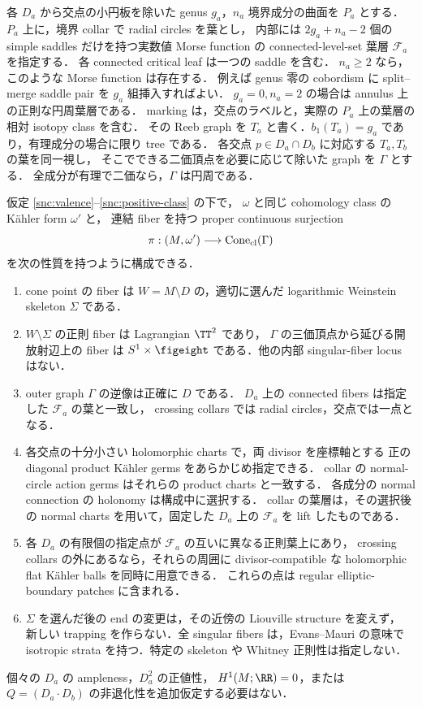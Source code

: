 各 $D_a$ から交点の小円板を除いた genus $g_a$，$n_a$ 境界成分の曲面を $P_a$ とする．
$P_a$ 上に，境界 collar で radial circles を葉とし，
内部には $2g_a+n_a-2$ 個の simple saddles だけを持つ実数値 Morse function の
connected-level-set 葉層 $\mathcal F_a$ を指定する．
各 connected critical leaf は一つの saddle を含む．
$n_a\geq2$ なら，このような Morse function は存在する．
例えば genus 零の cobordism に split--merge saddle pair を $g_a$ 組挿入すればよい．
$g_a=0,n_a=2$ の場合は annulus 上の正則な円周葉層である．
marking は，交点のラベルと，実際の $P_a$ 上の葉層の相対 isotopy class を含む．
その Reeb graph を $T_a$ と書く．$b_1(T_a)=g_a$ であり，有理成分の場合に限り tree である．
各交点 $p\in D_a\cap D_b$ に対応する $T_a,T_b$ の葉を同一視し，
そこでできる二価頂点を必要に応じて除いた graph を $\Gamma$ とする．
全成分が有理で二価なら，$\Gamma$ は円周である．

\begin{theorem}
\label{snc:main}
仮定 \eqref{snc:valence}--\eqref{snc:positive-class} の下で，
$\omega$ と同じ cohomology class の Kähler form $\omega'$ と，
連結 fiber を持つ proper continuous surjection
\[
 \pi:(M,\omega')\longrightarrow\operatorname{Cone}_{\rm cl}(\Gamma)
\]
を次の性質を持つように構成できる．
\begin{enumerate}
\item cone point の fiber は $W=M\setminus D$ の，適切に選んだ
  logarithmic Weinstein skeleton $\Sigma$ である．
\item $W\setminus\Sigma$ の正則 fiber は Lagrangian $\TT^2$ であり，
  $\Gamma$ の三価頂点から延びる開放射辺上の fiber は
  $S^1\times\figeight$ である．他の内部 singular-fiber locus はない．
\item outer graph $\Gamma$ の逆像は正確に $D$ である．
  $D_a$ 上の connected fibers は指定した $\mathcal F_a$ の葉と一致し，
  crossing collars では radial circles，交点では一点となる．
\item 各交点の十分小さい holomorphic charts で，両 divisor を座標軸とする
  正の diagonal product Kähler germs をあらかじめ指定できる．
  collar の normal-circle action germs はそれらの product charts と一致する．
  各成分の normal connection の holonomy は構成中に選択する．
  collar の葉層は，その選択後の normal charts を用いて，固定した $D_a$ 上の
  $\mathcal F_a$ を lift したものである．
\item 各 $D_a$ の有限個の指定点が $\mathcal F_a$ の互いに異なる正則葉上にあり，
  crossing collars の外にあるなら，それらの周囲に divisor-compatible な
  holomorphic flat Kähler balls を同時に用意できる．
  これらの点は regular elliptic-boundary patches に含まれる．
\item $\Sigma$ を選んだ後の end の変更は，その近傍の Liouville structure を変えず，
  新しい trapping を作らない．全 singular fibers は，Evans--Mauri の意味で
  isotropic strata を持つ．特定の skeleton や Whitney 正則性は指定しない．
\end{enumerate}
個々の $D_a$ の ampleness，$D_a^2$ の正値性，
$H^1(M;\RR)=0$，または $Q=(D_a\cdot D_b)$ の非退化性を追加仮定する必要はない．
\end{theorem}

